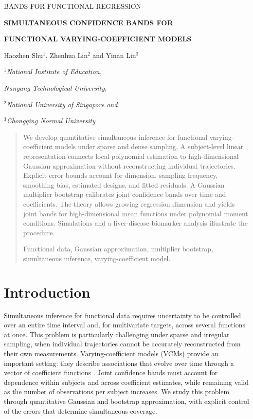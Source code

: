 \documentclass[12pt]{article}
\date{}
\numberwithin{equation}{section}
\newcommand{\bodyfont}{\fontsize{12}{14pt plus.8pt minus .6pt}\selectfont}
\renewenvironment{abstract}{\begin{quotation}\noindent{\it Abstract:} }{%
\par\vspace{9pt}\noindent{\it Key words and phrases:} Functional data, Gaussian approximation, multiplier bootstrap, simultaneous inference, varying-coefficient model.\end{quotation}}
\begin{document}
\renewcommand{\baselinestretch}{2}
\bodyfont
{}
{\hfill{\footnotesize\rm BANDS FOR FUNCTIONAL REGRESSION}\hfill}
\thispagestyle{firstpage}
$\ $\par\vspace{0.8pc}
\centerline{\large\bf SIMULTANEOUS CONFIDENCE BANDS FOR}
\vspace{2pt}
\centerline{\large\bf FUNCTIONAL VARYING-COEFFICIENT MODELS}
\vspace{.4cm}
\centerline{Haozhen Shu$^1$, Zhenhua Lin$^2$ and Yinan Lin$^3$}
\vspace{.4cm}
\centerline{\it $^1$National Institute of Education,}
\centerline{\it Nanyang Technological University,}
\centerline{\it $^2$National University of Singapore and}
\centerline{\it $^3$Chongqing Normal University}
\vspace{.55cm}

\fontsize{9}{11.5pt plus.8pt minus.6pt}\selectfont
\begin{abstract}
We develop quantitative simultaneous inference for functional varying-coefficient models under sparse and dense sampling. A subject-level linear representation connects local polynomial estimation to high-dimensional Gaussian approximation without reconstructing individual trajectories. Explicit error bounds account for dimension, sampling frequency, smoothing bias, estimated designs, and fitted residuals. A Gaussian multiplier bootstrap calibrates joint confidence bands over time and coefficients. The theory allows growing regression dimension and yields joint bands for high-dimensional mean functions under polynomial moment conditions. Simulations and a liver-disease biomarker analysis illustrate the procedure.
\end{abstract}
\bodyfont

\section{Introduction}\label{sec:intro}

Simultaneous inference for functional data requires uncertainty to be controlled over an entire time interval and, for multivariate targets, across several functions at once. This problem is particularly challenging under sparse and irregular sampling, when individual trajectories cannot be accurately reconstructed from their own measurements. Varying-coefficient models (VCMs) provide an important setting: they describe associations that evolve over time through a vector of coefficient functions \citep{hastie_tibshirani_1993,gu_et_al_2014,cao_simultaneous_2018}. Joint confidence bands must account for dependence within subjects and across coefficient estimates, while remaining valid as the number of observations per subject increases. We study this problem through quantitative Gaussian and bootstrap approximation, with explicit control of the errors that determine simultaneous coverage.
\end{document}
